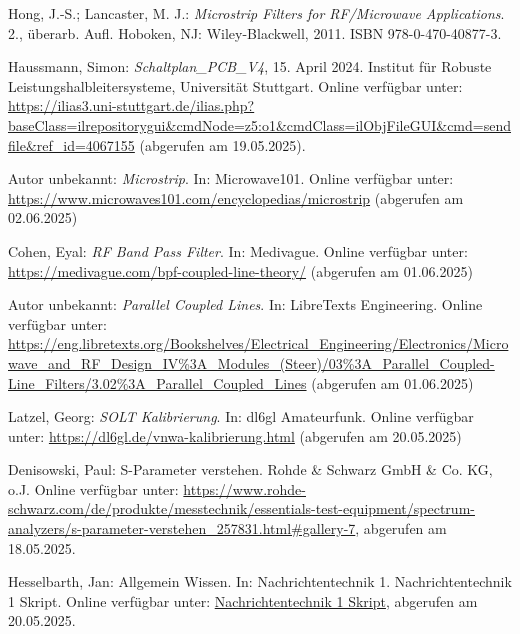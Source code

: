 \begin{thebibliography}{1}
Hong, J.-S.; Lancaster, M. J.: \emph{Microstrip Filters for RF/Microwave Applications}. 2., überarb. Aufl. Hoboken, NJ: Wiley-Blackwell, 2011. ISBN 978-0-470-40877-3.

Haussmann, Simon: \emph{Schaltplan\_PCB\_V4}, 15. April 2024. Institut für Robuste Leistungshalbleitersysteme, Universität Stuttgart. Online verfügbar unter: \url{https://ilias3.uni-stuttgart.de/ilias.php?baseClass=ilrepositorygui&cmdNode=z5:o1&cmdClass=ilObjFileGUI&cmd=sendfile&ref_id=4067155} (abgerufen am 19.05.2025).


Autor unbekannt: \emph{Microstrip}. In: Microwave101. Online verfügbar unter: \url{https://www.microwaves101.com/encyclopedias/microstrip} (abgerufen am 02.06.2025)


Cohen, Eyal: \emph{RF Band Pass Filter}. In: Medivague. Online verfügbar unter: \url{https://medivague.com/bpf-coupled-line-theory/} (abgerufen am 01.06.2025)


Autor unbekannt: \emph{Parallel Coupled Lines}. In: LibreTexts Engineering. Online verfügbar unter: \url{https://eng.libretexts.org/Bookshelves/Electrical_Engineering/Electronics/Microwave_and_RF_Design_IV%3A_Modules_(Steer)/03%3A_Parallel_Coupled-Line_Filters/3.02%3A_Parallel_Coupled_Lines} (abgerufen am 01.06.2025)


Latzel, Georg: \emph{SOLT Kalibrierung}. In: dl6gl Amateurfunk. Online verfügbar unter: \url{https://dl6gl.de/vnwa-kalibrierung.html} (abgerufen am 20.05.2025)
  
Denisowski, Paul: S-Parameter verstehen. Rohde \& Schwarz GmbH \& Co. KG, o.J. Online verfügbar unter: \url{https://www.rohde-schwarz.com/de/produkte/messtechnik/essentials-test-equipment/spectrum-analyzers/s-parameter-verstehen_257831.html#gallery-7}, abgerufen am 18.05.2025.

Hesselbarth, Jan: Allgemein Wissen. In: Nachrichtentechnik 1. Nachrichtentechnik 1 Skript. Online verfügbar unter: \url{Nachrichtentechnik 1 Skript}, abgerufen am 20.05.2025.




\end{thebibliography}

\clearpage
